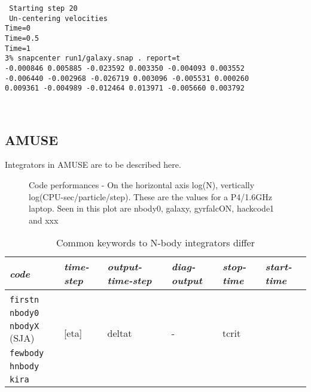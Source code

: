 {\begin{verbatim}
 Starting step 20
 Un-centering velocities
Time=0
Time=0.5
Time=1
3% snapcenter run1/galaxy.snap . report=t
-0.000846 0.005885 -0.023592 0.003350 -0.004093 0.003552 
-0.006440 -0.002968 -0.026719 0.003096 -0.005531 0.000260 
0.009361 -0.004989 -0.012464 0.013971 -0.005660 0.003792 



\end{verbatim}
\normalsize

\subsection{AMUSE}

Integrators in AMUSE are to be described here.



\begin{figure}[htb]
\caption[Code Performances]
{Code performances - On the horizontal axis log(N), vertically log(CPU-sec/particle/step).
These are the values for a P4/1.6GHz laptop. Seen in this plot
are nbody0, galaxy, gyrfalcON, hackcode1 and xxx}
\label{f:performance}
\end{figure}


\begin{center}
\begin{table}[h]
\caption[Common integrator keywords]
{Common keywords to N-body integrators differ}
\begin{tabular}{||l|l|l|l|l|l||}

\hline 
{\it code} & {\it time-step}  & {\it output-time-step}  & {\it diag-output} & {\it stop-time} & {\it start-time} \\

\hline &&&&& \\

{\tt firstn}         & & & & & \\

{\tt nbody0}         & & & & & \\

{\tt nbodyX}  (SJA)  & [eta] & deltat & - & tcrit & \\

{\tt fewbody}        &  & & & & \\

{\tt hnbody}         &  & & & & \\

{\tt kira}           &  & & & & \\


\end{tabular}
\end{table}
\end{center}}
